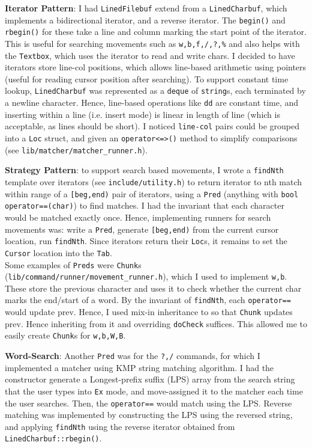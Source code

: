 \documentclass{article}
\begin{document}
\textbf{Iterator Pattern}: I had \texttt{LinedFilebuf} extend from a \texttt{LinedCharbuf}, 
which implements a bidirectional iterator, and a reverse iterator. 
The \texttt{begin()} and \texttt{rbegin()} for these take a line and column 
marking the start point of the iterator. 
This is useful for searching movements such as 
\texttt{w,b,f,/,?,\%} and also helps with the \texttt{Textbox}, 
which uses the iterator to read and write chars. 
I decided to have iterators store line-col positions, which allows 
line-based arithmetic using pointers (useful for reading cursor position after searching).
To support constant time lookup, \texttt{LinedCharbuf} was represented as a \texttt{deque}
of \texttt{string}s, each terminated by a newline character. 
Hence, line-based operations like \texttt{dd} are constant time, 
and inserting within a line (i.e. insert mode) is linear in length of line 
(which is acceptable, as lines should be short). 
I noticed \texttt{line-col} pairs could be grouped into a \texttt{Loc} struct, 
and given an \texttt{operator<=>()} method to simplify comparisons 
(see \texttt{lib/matcher/matcher\_runner.h}). 

\textbf{Strategy Pattern}: to support search based movements, 
I wrote a \texttt{findNth} template over iterators (see \texttt{include/utility.h}) 
to return iterator to nth match within range of a \texttt{[beg,end)} pair of iterators, 
using a \texttt{Pred} (anything with \texttt{bool operator==(char)}) to find matches. 
I had the invariant that each character would be matched exactly once. 
Hence, implementing runners for search movements was: 
write a \texttt{Pred}, generate \texttt{[beg,end)} from the current cursor location, 
run \texttt{findNth}. Since iterators return their \texttt{Loc}s, 
it remains to set the \texttt{Cursor} location into the \texttt{Tab}. 
\\Some examples of \texttt{Preds} were \texttt{Chunk}s 
(\texttt{lib/command/runner/movement\_runner.h}), 
which I used to implement \texttt{w,b}. 
These store the previous character and uses it to check whether the current char
marks the end/start of a word. By the invariant of \texttt{findNth}, 
each \texttt{operator==} would update prev. 
Hence, I used mix-in inheritance to so that \texttt{Chunk} updates prev. 
Hence inheriting from it and overriding \texttt{doCheck} suffices. 
This allowed me to easily create \texttt{Chunk}s for \texttt{w,b,W,B}. 

\textbf{Word-Search}: Another \texttt{Pred} was for the \texttt{?,/} commands, 
for which I implemented a matcher using KMP string matching algorithm. 
I had the constructor generate a Longest-prefix suffix (LPS) array from the search string
that the user types into \texttt{Ex} mode, 
and move-assigned it to the matcher each time the user searches. 
Then, the \texttt{operator==} would match using the LPS. 
Reverse matching was implemented by constructing the LPS using the reversed string, 
and applying \texttt{findNth} using the reverse iterator 
obtained from \texttt{LinedCharbuf::rbegin()}. 
\end{document}
